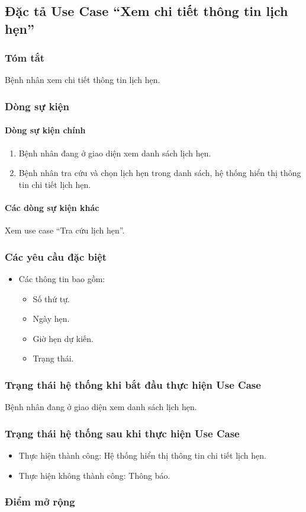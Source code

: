 \subsection{Đặc tả Use Case ``Xem chi tiết thông tin lịch hẹn''}

\subsubsection{Tóm tắt}
Bệnh nhân xem chi tiết thông tin lịch hẹn.

\subsubsection{Dòng sự kiện}
\paragraph{\textbf{Dòng sự kiện chính}}
\begin{enumerate}
  \item Bệnh nhân đang ở giao diện xem danh sách lịch hẹn.
  \item Bệnh nhân tra cứu và chọn lịch hẹn trong danh sách, hệ thống hiển thị thông tin chi tiết lịch hẹn.
\end{enumerate}

\paragraph{\textbf{Các dòng sự kiện khác}}
Xem use case ``Tra cứu lịch hẹn''.

\subsubsection{Các yêu cầu đặc biệt}
\begin{itemize}
  \item Các thông tin bao gồm:
    \begin{itemize}
      \item Số thứ tự.
      \item Ngày hẹn.
      \item Giờ hẹn dự kiến.
      \item Trạng thái.
    \end{itemize}
\end{itemize}

\subsubsection{Trạng thái hệ thống khi bắt đầu thực hiện Use Case}
Bệnh nhân đang ở giao diện xem danh sách lịch hẹn.

\subsubsection{Trạng thái hệ thống sau khi thực hiện Use Case}
\begin{itemize}
  \item Thực hiện thành công: Hệ thống hiển thị thông tin chi tiết lịch hẹn.
  \item Thực hiện không thành công: Thông báo.
\end{itemize}

\subsubsection{Điểm mở rộng}